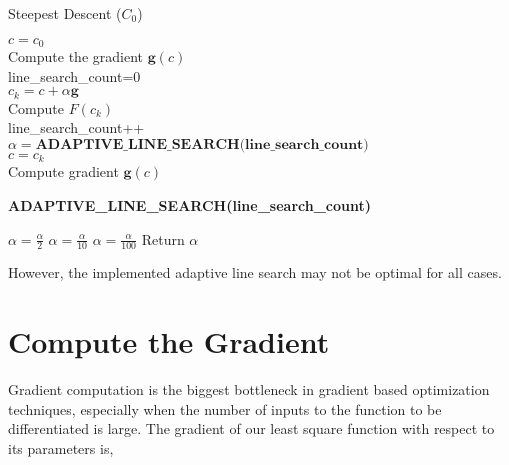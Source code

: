 \documentclass[10pt,a4paper]{report}
\begin{document}
\begin{algorithm}[H]
\caption{Steepest Descent ($C_0$)}

  $c=c_{0}$\\
  Compute the gradient $\textbf{g}(c)$\\
  {
  line\_search\_count=0 \\
    {
	$c_{k}=c + \alpha \textbf{g}$\\
	Compute $F(c_{k})$\\
	line\_search\_count++ \\
	$\alpha =\textbf{ADAPTIVE\_LINE\_SEARCH(line\_search\_count)}$\\
    }
    $c=c_{k}$\\
    Compute gradient $\textbf{g}(c)$\\
  }
\end{algorithm}

\begin{algorithm}[H]
\caption{\textbf{ADAPTIVE\_LINE\_SEARCH(line\_search\_count)}}
  \KwOut{$\alpha$}
  {  
  $\alpha=\frac{\alpha}{2}$
  }
  {
  $\alpha=\frac{\alpha}{10}$
  }
  \Else	
  {
  $\alpha=\frac{\alpha}{100}$
  }
  Return $\alpha$
\end{algorithm}

However, the implemented adaptive line search may not be optimal for all cases.

\section{Compute the Gradient}

Gradient computation is the biggest bottleneck in gradient based optimization techniques, especially when the number of inputs to the function to be differentiated is large. The gradient of our least square function with respect to its parameters is, 
 
\end{document}
